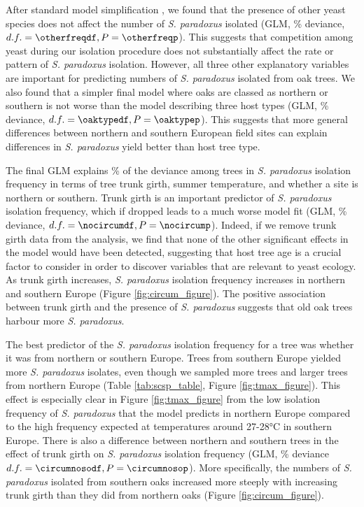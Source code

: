 \documentclass[12pt]{article}
\begin{document}
\begin{linenumbers}
After standard model simplification \citep{crawley_statistics:_2005}, we found that the presence of other yeast species does not affect the number of \textit{S. paradoxus} isolated (GLM, \otherfreqdev\% deviance, $d.f.=\otherfreqdf,P=\otherfreqp$). This suggests that competition among yeast during our isolation procedure does not substantially affect the rate or pattern of \textit{S. paradoxus} isolation. However, all three other explanatory variables are important for predicting numbers of \textit{S. paradoxus} isolated from oak trees. We also found that a simpler final model where oaks are classed as northern or southern is not worse than the model describing three host types (GLM, \oaktypedev\% deviance, $d.f.=\oaktypedf,P=\oaktypep$). This suggests that more general differences between northern and southern European field sites can explain differences in \textit{S. paradoxus} yield better than host tree type. 

The final GLM explains \finalpcentdev\% of the deviance among trees in \textit{S. paradoxus} isolation frequency in terms of tree trunk girth, summer temperature, and whether a site is northern or southern. Trunk girth is an important predictor of \textit{S. paradoxus} isolation frequency, which if dropped leads to a much worse model fit (GLM, \nocircumdev\% deviance, $d.f.=\nocircumdf,P=\nocircump$). Indeed, if we remove trunk girth data from the analysis, we find that none of the other significant effects in the model would have been detected, suggesting that host tree age is a crucial factor to consider in order to discover variables that are relevant to yeast ecology. As trunk girth increases, \textit{S. paradoxus} isolation frequency increases in northern and southern Europe (Figure \ref{fig:circum_figure}). The positive association between trunk girth and the presence of \textit{S. paradoxus} suggests that old oak trees harbour more \textit{S. paradoxus}. 

The best predictor of the \textit{S. paradoxus} isolation frequency for a tree was whether it was from northern or southern Europe. Trees from southern Europe yielded more \textit{S. paradoxus} isolates, even though we sampled more trees and larger trees from northern Europe (Table \ref{tab:scsp_table}, Figure \ref{fig:tmax_figure}). This effect is especially clear in Figure \ref{fig:tmax_figure} from the low isolation frequency of \textit{S. paradoxus} that the model predicts in northern Europe compared to the high frequency expected at temperatures around 27-28\si{\degreeCelsius} in southern Europe. There is also a difference between northern and southern trees in the effect of trunk girth on \textit{S. paradoxus} isolation frequency (GLM, \circumnosopcentdev\% deviance $d.f.=\circumnosodf, P=\circumnosop$). More specifically, the numbers of \textit{S. paradoxus} isolated from southern oaks increased more steeply with increasing trunk girth than they did from northern oaks (Figure \ref{fig:circum_figure}). 


\end{linenumbers}
\end{document}
